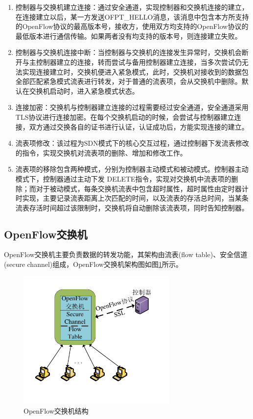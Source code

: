 \begin{enumerate}
\item 控制器与交换机建立连接：通过安全通道，实现控制器和交换机连接的建立，在连接建立以后，某一方发送OFPT\_HELLO消息，该消息中包含本方所支持的OpenFlow协议的最高版本号，接收方，使用双方均支持的OpenFlow协议的最低版本进行通信传输。如果两者没有均支持的版本号，则连接建立失败。
\item 控制器与交换机连接中断：当控制器与交换机的连接发生异常时，交换机会断开与主控制器建立的连接，转而尝试与备用控制器建立连接，当多次尝试仍无法实现连接建立时，交换机便进入紧急模式，此时，交换机对接收到的数据包全部匹配紧急模式流表进行转发，对于普通的流表项，会从交换机中删除。默认在交换机启动时，进入紧急模式状态。
\item 连接加密：交换机与控制器建立连接的过程需要经过安全通道，安全通道采用\gls*{TLS}协议进行连接加密。在每个交换机启动的时候，会尝试与控制器建立连接，双方通过交换各自的证书进行认证，认证成功后，方能实现连接的建立。
\item 流表项修改：该过程为SDN模式下的核心交互过程，通过控制器下发流表修改的指令，实现交换机对流表项的删除、增加和修改工作。
\item 流表项的移除包含两种模式，分别为控制器主动模式和被动模式。控制器主动模式下，控制器通过主动下发 DELETE指令，实现对交换机中流表项的删除；而对于被动模式，每条交换机流表中包含超时属性，超时属性由定时器计时实现，主要记录流表距离上次匹配的时间，以及流表的存活总时间，当某条流表存活时间超过该限制时，交换机将自动删除该流表项，同时告知控制器。
\end{enumerate}

\subsection{OpenFlow交换机}
OpenFlow交换机主要负责数据的转发功能，其架构由流表(flow table)、安全信道(secure channel)组成\cite{openflow-1}，OpenFlow交换机架构图如图\ref{fig:of-switch}所示。

\begin{figure}[!htb]
  \centering
  \includegraphics[width=0.7\textwidth]{logo/of-switch}
  \caption{OpenFlow交换机结构}
  \label{fig:of-switch}
\end{figure}

